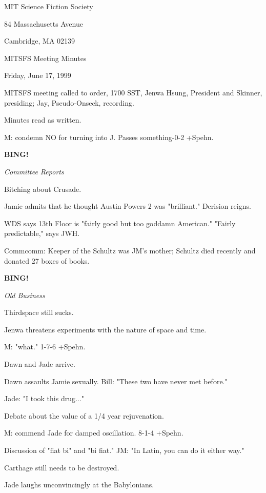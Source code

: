 \documentclass[12pt]{article}
\newcommand{\bing}{{\bf BING!} }
\newcommand{\goto}[1]{\bing \vskip 12pt \centerline{{\em{#1}}}}
\begin{document}
\begin{center}

MIT Science Fiction Society 

84 Massachusetts Avenue

Cambridge, MA 02139

\vspace{12pt}

MITSFS Meeting Minutes 

Friday, June 17, 1999

\end{center}
 
\vspace{18pt}

\setlength{\parskip}{6pt}

\noindent
MITSFS meeting called to order, 1700 SST,
Jenwa Hsung, President and Skinner, presiding; Jay, Pseudo-Onseck, recording.

Minutes read as written.

M: condemn NO for turning into J. Passes something-0-2 +Spehn.

\goto{Committee Reports}

Bitching about Crusade.

Jamie admits that he thought Austin Powers 2 was "brilliant." Derision reigns.

WDS says 13th Floor is "fairly good but too goddamn American." "Fairly predictable," says JWH.

Commcomm: Keeper of the Schultz was JM's mother; Schultz died recently and donated 27 boxes of books.

\goto{Old Business}

Thirdspace still sucks.

Jenwa threatens experiments with the nature of space and time.

M: "what." 1-7-6 +Spehn.

Dawn and Jade arrive.

Dawn assaults Jamie sexually. Bill: "These two have never met before."

Jade: "I took this drug..."

Debate about the value of a 1/4 year rejuvenation.

M: commend Jade for damped oscillation. 8-1-4 +Spehn.

Discussion of "fiat bi" and "bi fiat." JM: "In Latin, you can do it either way."

Carthage still needs to be destroyed.

Jade laughs unconvincingly at the Babylonians.
\end{document}
